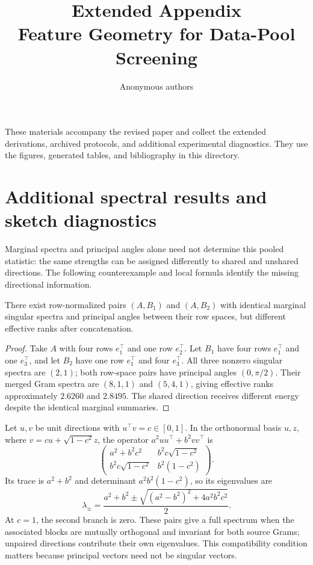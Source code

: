 \documentclass{article}
\title{Extended Appendix\\Feature Geometry for Data-Pool Screening}
\author{Anonymous authors}
\begin{document}
\maketitle
These materials accompany the revised paper and collect the extended derivations, archived protocols, and additional experimental diagnostics. They use the figures, generated tables, and bibliography in this directory.

\section{Additional spectral results and sketch diagnostics}

Marginal spectra and principal angles alone need not determine this pooled statistic: the same strengths can be assigned differently to shared and unshared directions. The following counterexample and local formula identify the missing directional information.

\begin{proposition}
There exist row-normalized pairs $(A,B_1)$ and $(A,B_2)$ with identical marginal singular spectra and principal angles between their row spaces, but different effective ranks after concatenation.
\end{proposition}
\begin{proof}
Take $A$ with four rows $e_1^\top$ and one row $e_2^\top$. Let $B_1$ have four rows $e_1^\top$ and one $e_3^\top$, and let $B_2$ have one row $e_1^\top$ and four $e_3^\top$. All three nonzero singular spectra are $(2,1)$; both row-space pairs have principal angles $(0,\pi/2)$. Their merged Gram spectra are $(8,1,1)$ and $(5,4,1)$, giving effective ranks approximately $2.6260$ and $2.8495$. The shared direction receives different energy despite the identical marginal summaries.
\end{proof}

Let $u,v$ be unit directions with $u^\top v=c\in[0,1]$. In the orthonormal basis $u,z$, where $v=cu+\sqrt{1-c^2}z$, the operator $a^2uu^\top+b^2vv^\top$ is
\begin{equation}
 \begin{pmatrix}
 a^2+b^2c^2 & b^2c\sqrt{1-c^2}\\
 b^2c\sqrt{1-c^2} & b^2(1-c^2)
 \end{pmatrix}.
\end{equation}
Its trace is $a^2+b^2$ and determinant $a^2b^2(1-c^2)$, so its eigenvalues are
\begin{equation}
 \lambda_{\pm}=\frac{a^2+b^2\pm\sqrt{(a^2-b^2)^2+4a^2b^2c^2}}{2}.
 \label{eq:local}
\end{equation}
At $c=1$, the second branch is zero. These pairs give a full spectrum when the associated blocks are mutually orthogonal and invariant for both source Grams; unpaired directions contribute their own eigenvalues. This compatibility condition matters because principal vectors need not be singular vectors.
\end{document}

